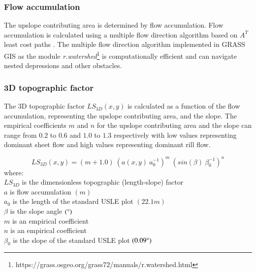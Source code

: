 \documentclass[final,3p,times,twocolumn]{elsarticle}
\begin{document}
\subsubsection{Flow accumulation}
The upslope contributing area is determined by flow accumulation. 
Flow accumulation is calculated using a multiple flow direction algorithm \cite{Metz2009} 
based on $A^{T}$ least cost paths \cite{Ehlschlaeger1989}. 
The multiple flow direction algorithm 
implemented in GRASS GIS as the module 
\textit{r.watershed}\footnote{https://grass.osgeo.org/grass72/manuals/r.watershed.html}
is computationally efficient and can
navigate nested depressions and other obstacles. 


\subsubsection{3D topographic factor}
The 3D topographic factor $LS_{3D}(x,y)$
is calculated as a function of 
the flow accumulation,
representing the upslope contributing area,
and the slope. 
%
The empirical coefficients $m$ and $n$
for the upslope contributing area 
and the slope
can range from $0.2$ to $0.6$
and $1.0$ to $1.3$ respectively
with low values representing dominant sheet flow
and high values representing dominant rill flow.


\begin{equation}
\label{eq:ls_factor}
{LS_{3D}(x,y) = (m+1.0) ~ (a(x,y) ~ a_0^{-1})^{m} ~ (sin(\beta) ~ \beta_0^{-1})^{n}}
\end{equation}
%
{\small
\noindent
where: \\
\noindent
\hspace*{0.5em} $LS_{3D}$ is the dimensionless topographic (length-slope) factor\\
\hspace*{0.5em} $a$ is flow accumulation $(m)$\\
\hspace*{0.5em} $a_0$ is the length of the standard USLE plot $(22.1 m)$\\
\hspace*{0.5em} $\beta$ is the slope angle $(\degree)$\\
\hspace*{0.5em} $m$ is an empirical coefficient\\
\hspace*{0.5em} $n$ is an empirical coefficient\\
\hspace*{0.5em} $\beta_0$ is the slope of the standard USLE plot $(0.09 \degree)$\\
}
\end{document}
